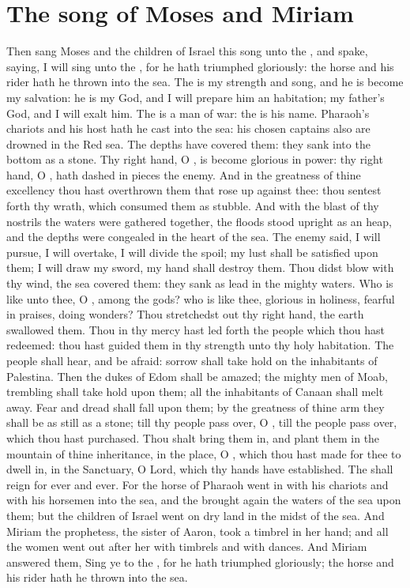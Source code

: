 \section*{The song of Moses and Miriam}
\begin{biblechapter} %
\verse Then sang Moses and the children of Israel this song unto the \LORD, and spake, saying, I will sing unto the \LORD, for he hath triumphed gloriously: the horse and his rider hath he thrown into the sea.
\verse The \LORD is my strength and song, and he is become my salvation: he is my God, and I will prepare him an habitation; my father's God, and I will exalt him.
\verse The \LORD is a man of war: the \LORD is his name.
\verse Pharaoh's chariots and his host hath he cast into the sea: his chosen captains also are drowned in the Red sea.
\verse The depths have covered them: they sank into the bottom as a stone.
\verse Thy right hand, O \LORD, is become glorious in power: thy right hand, O \LORD, hath dashed in pieces the enemy.
\verse And in the greatness of thine excellency thou hast overthrown them that rose up against thee: thou sentest forth thy wrath, which consumed them as stubble.
\verse And with the blast of thy nostrils the waters were gathered together, the floods stood upright as an heap, and the depths were congealed in the heart of the sea.
\verse The enemy said, I will pursue, I will overtake, I will divide the spoil; my lust shall be satisfied upon them; I will draw my sword, my hand shall destroy them.
\verse Thou didst blow with thy wind, the sea covered them: they sank as lead in the mighty waters.
\verse Who is like unto thee, O \LORD, among the gods? who is like thee, glorious in holiness, fearful in praises, doing wonders?
\verse Thou stretchedst out thy right hand, the earth swallowed them.
\verse Thou in thy mercy hast led forth the people which thou hast redeemed: thou hast guided them in thy strength unto thy holy habitation.
\verse The people shall hear, and be afraid: sorrow shall take hold on the inhabitants of Palestina.
\verse Then the dukes of Edom shall be amazed; the mighty men of Moab, trembling shall take hold upon them; all the inhabitants of Canaan shall melt away.
\verse Fear and dread shall fall upon them; by the greatness of thine arm they shall be as still as a stone; till thy people pass over, O \LORD, till the people pass over, which thou hast purchased.
\verse Thou shalt bring them in, and plant them in the mountain of thine inheritance, in the place, O \LORD, which thou hast made for thee to dwell in, in the Sanctuary, O Lord, which thy hands have established.
\verse The \LORD shall reign for ever and ever.
\verse For the horse of Pharaoh went in with his chariots and with his horsemen into the sea, and the \LORD brought again the waters of the sea upon them; but the children of Israel went on dry land in the midst of the sea.
\verse And Miriam the prophetess, the sister of Aaron, took a timbrel in her hand; and all the women went out after her with timbrels and with dances.
\verse And Miriam answered them, Sing ye to the \LORD, for he hath triumphed gloriously; the horse and his rider hath he thrown into the sea.

\end{biblechapter}
